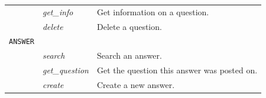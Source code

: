 \begin{table}
\begin{center}
\begin{tabular}{p{70px} | p{70px} | p{210px}}
															& \emph{get\_info}				& Get information on a question. \\
															& \emph{delete}						& Delete a question. \\
				\hline
				\texttt{ANSWER}				& 												&	\\
				\hline
															& \emph{search}						& Search an answer.	\\
															& \emph{get\_question}		& Get the question this answer was posted on. \\
															& \emph{create}						& Create a new answer. \\
				\hline
				\hline
		\end{tabular}
	\end{center}

	\label{table:rest_api}
\end{table}
